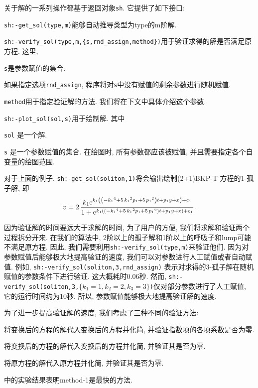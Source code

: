 关于解的一系列操作都基于返回对象\texttt{sh}.  它提供了如下接口: 
\begin{compactitem}[\textbullet]
\item \texttt{sh:-get\_sol(type,m)}能够自动推导类型为type的m阶解. 
\item \verb|sh:-verify_sol(type,m,{s,rnd_assign,method})|用于验证求得的解是否满足原方程. 这里,
\begin{compactitem}[- ]
\item \texttt{s}是参数赋值的集合.
\item 如果指定选项\texttt{rnd\_assign}, 程序将对\texttt{s}中没有赋值的剩余参数进行随机赋值.
\item \texttt{method}用于指定验证解的方法. 我们将在下文中具体介绍这个参数. 
\end{compactitem}
\item \verb|sh:-plot_sol(sol,s)|用于绘制解. 其中
\begin{compactitem}[- ]
\item \texttt{sol} 是一个解. 
\item \texttt{s} 是一个参数赋值的集合. 在绘图时, 所有参数都应该被赋值, 并且需要指定各个自变量的绘图范围.
\end{compactitem}
\end{compactitem}

对于上面的例子, \texttt{sh:-get\_sol(soliton,1)}将会输出绘制(2+1)BKP-T 方程的1-孤子解, 即 
\begin{equation}
v=2\,{\frac {k_{{1}}{{\rm e}^{k_{{1}} \left(  \left( -{k_{{1}}}^{4}+5\,{
k_{{1}}}^{2}p_{{1}}+5\,{p_{{1}}}^{2} \right) t+p_{{1}}y+x \right)+c_1 }}}{
1+{{\rm e}^{k_{{1}} \left(  \left( -{k_{{1}}}^{4}+5\,{k_{{1}}}^{2}p_{{
1}}+5\,{p_{{1}}}^{2} \right) t+p_{{1}}y+x \right)+c_1 }}}}.
\end{equation}

因为验证解的时间要远大于求解的时间, 为了用户的方便, 我们将求解和验证两个过程拆分开来. 在我们的算法中, 2阶以上的孤子解和1阶以上的呼吸子和lump可能不满足原方程. 因此, 我们需要利用\texttt{sh:-verify\_sol(type,m)}来验证他们. 因为对参数赋值后能够极大地提高验证的速度, 我们可以对参数进行人工赋值或者自动赋值. 例如, \texttt{sh:-verify\_sol(soliton,3,rnd\_assign)} 表示对求得的3-孤子解在随机赋值的参数条件下进行验证. 这大概耗时0.06秒. 然而, \texttt{sh:-verify\_sol(soliton,3,$\{k_1=1,k_2=2,k_3=3\}$)}仅对部分参数进行了人工赋值, 它的运行时间约为10秒. 所以, 参数赋值能够极大地提高验证解的速度. 

为了进一步提高验证解的速度, 我们考虑了三种不同的验证方法: 
\begin{compactenum}[method-1:]
\item 将变换后的方程的解代入变换后的方程并化简, 并验证指数项的各项系数是否为零.
\item 将变换后的方程的解代入变换后的方程并化简, 并验证其是否为零.
\item 将原方程的解代入原方程并化简, 并验证其是否为零.
\end{compactenum}
中的实验结果表明method-1是最快的方法. 

